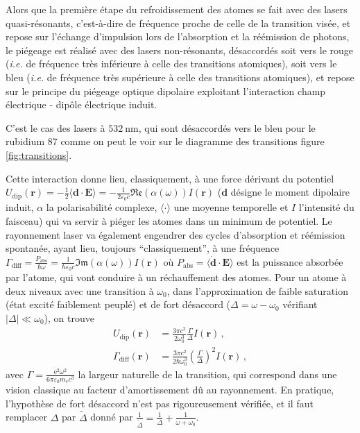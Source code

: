 \documentclass[11pt,a4paper]{article}
\newcommand{\lmbd}[1]{$\SI{#1}{\nano\metre}$}
\newcommand{\e}[1]{\text{e}^{#1}}
\newcommand{\mathsc}[1]{\mathrm{\scriptscriptstyle {#1}}}
\renewcommand{\v}[1]{\boldsymbol{\mathbf{#1}}}
\begin{document}
\label{lasers}

Alors que la première étape du refroidissement des atomes se fait avec des lasers quasi-résonants, c'est-à-dire de fréquence proche de celle de la transition visée, et repose sur l'échange d'impulsion lors de l'absorption et la réémission de photons, le piégeage est réalisé avec des lasers non-résonants, désaccordés soit vers le rouge (\textit{i.e.} de fréquence très inférieure à celle des transitions atomiques), soit vers le bleu (\textit{i.e.} de fréquence très supérieure à celle des transitions atomiques), et repose sur le principe du piégeage optique dipolaire exploitant l'interaction champ électrique - dipôle électrique induit.

C'est le cas des lasers à \lmbd{532}, qui sont désaccordés vers le bleu pour le rubidium 87 comme on peut le voir sur le diagramme des transitions figure \ref{fig:transitions}.

Cette interaction donne lieu, classiquement, à une force dérivant du potentiel $U_\mathsc{dip}(\v r) = {-\frac12 \langle \v d \cdot \v E \rangle} = -\frac{1}{2\varepsilon_0 c}\mathfrak{Re}\left(\alpha(\omega)\right) I(\v r)$ ($\v d$ désigne le moment dipolaire induit, $\alpha$ la polarisabilité complexe, $\langle \cdot \rangle$ une moyenne temporelle et $I$ l'intensité du faisceau)
qui va servir à piéger les atomes dans un minimum de potentiel. Le rayonnement laser va également engendrer des cycles d'absorption et réémission spontanée, ayant lieu, toujours ``classiquement'', à une fréquence $\Gamma_\mathsc{diff} = \frac{P_\mathsc{abs}}{\hbar \omega} = \frac{1}{\hbar \varepsilon_0 c} \mathfrak{Im}\left(\alpha(\omega)\right) I(\v r)$ où $P_\mathsc{abs} = \langle \dot{\v d} \cdot \v E \rangle$ est la puissance absorbée par l'atome, qui vont conduire à un réchauffement des atomes. 
Pour un atome à deux niveaux avec une transition à $\omega_0$, dans l'approximation de faible saturation (état excité faiblement peuplé) et de fort désaccord ($\Delta = \omega - \omega_0$ vérifiant $|\Delta| \ll \omega_0$), on trouve %
\vspace{-0.2cm}
\begin{align}
	U_\mathsc{dip}(\v r)&=\frac{3\pi c^2}{2\omega_0^3} \frac{\Gamma}{\Delta} I(\v r) \,, \\
	\Gamma_\mathsc{diff}(\v r)&=\frac{3\pi c^2}{2\hbar\omega_0^3} \left(\frac{\Gamma}{\Delta}\right)^2 I(\v r) \,,
\end{align}
avec $\Gamma = \frac{\e 2 \omega^2}{6 \pi \varepsilon_0 m_e c^3}$ la largeur naturelle de la transition, qui correspond dans une vision classique au facteur d'amortissement dû au rayonnement. En pratique, l'hypothèse de fort désaccord n'est pas rigoureusement vérifiée, et il faut remplacer $\Delta$ par $\widetilde{\Delta}$ donné par $\frac{1}{\widetilde{\Delta}} = \frac1\Delta + \frac{1}{\omega+\omega_0}$.
\end{document}
